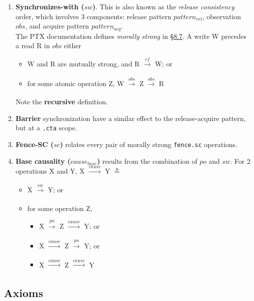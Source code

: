 \documentclass[11pt,a4paper]{article}
\begin{document}
\begin{enumerate}
    \item \textbf{Synchronizes-with ($sw$)}. This is also known as the \textit{release consistency} order, which involves 3 components: release pattern $pattern_{rel}$, observation $obs$, and acquire pattern $pattern_{acq}$.\\

    The PTX documentation defines \textit{morally strong} in \href{https://docs.nvidia.com/cuda/parallel-thread-execution/index.html#morally-strong-operations}{\S8.7}. A write W precedes a read R in $obs$ either
    
    \begin{itemize}
        \item W and R are mutually strong, and R $\xrightarrow[]{rf}$ W; or
        \item for some atomic operation Z, W $\xrightarrow[]{obs}$ Z $\xrightarrow[]{obs}$ R
    \end{itemize}

    Note the \textbf{recursive} definition.
    \item \textbf{Barrier} synchronization have a similar effect to the release-acquire pattern, but at a \verb|.cta| scope.
    \item \textbf{Fence-SC ($sc$)} relates every pair of morally strong \verb|fence.sc| operations.
    \item \textbf{Base causality ($cause_{base}$)} results from the combination of $po$ and $sw$. For 2 operations X and Y, X $\xrightarrow[]{cause}$ Y $\displaystyle \triangleq$

    \begin{itemize}
        \item X $\xrightarrow[]{sw}$ Y; or
        \item for some operation Z,
        
        \begin{itemize}
            \item X $\xrightarrow[]{po}$ Z $\xrightarrow[]{cause}$ Y; or
            \item X $\xrightarrow[]{cause}$ Z $\xrightarrow[]{po}$ Y; or
            \item X $\xrightarrow[]{cause}$ Z $\xrightarrow[]{cause}$ Y
        \end{itemize} 
    \end{itemize}
\end{enumerate}

\subsection{Axioms}
\end{document}
